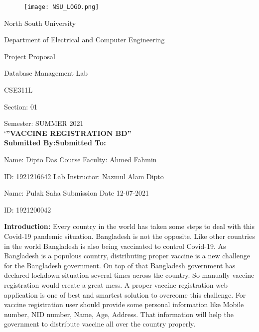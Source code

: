 \documentclass[
]{article}
\author{}
\date{}
\begin{document}
\begin{figure}
\quad \quad \quad \quad \quad \quad \quad \quad  \texttt{[image: NSU\_LOGO.png]}
\end{figure}
\quad \quad \quad \quad \quad \quad \quad \quad \quad \quad \quad North South University

\quad \quad \quad \quad \quad \quad \quad Department of Electrical and Computer Engineering

\quad \quad \quad \quad \quad\quad \quad \quad \quad \quad \quad  Project Proposal

\quad \quad \quad \quad \quad\quad \quad \quad \quad \quad Database Management Lab

\quad \quad \quad \quad \quad\quad \quad \quad \quad \quad \quad \quad \quad  CSE311L

\quad \quad \quad  \quad \quad\quad \quad \quad \quad \quad \quad \quad \quad Section: 01

\quad \quad \quad \quad \quad\quad \quad \quad \quad \quad \quad Semester: SUMMER 2021 \\[5mm]

\quad \quad \quad\quad  \quad \quad \quad`\textbf{''VACCINE REGISTRATION BD''} \\[5mm]

\quad \quad \quad \textbf{Submitted By:}\quad \quad \quad \quad \quad \quad \quad  \textbf{Submitted To:}

\quad \quad \quad Name: Dipto Das \quad \quad \quad \quad \quad \quad Course Faculty: Ahmed Fahmin

\quad \quad \quad ID: 1921216642 \quad \quad \quad \quad \quad\quad \quad  Lab Instructor: Nazmul Alam Dipto

\quad \quad \quad Name: Pulak Saha \quad \quad \quad \quad \quad \quad Submission Date 12-07-2021

\quad \quad \quad ID: 1921200042









\textbf{Introduction:} Every country in the world has taken some steps
to deal with this Covid-19 pandemic situation. Bangladesh is not the
opposite. Like other countries in the world Bangladesh is also being
vaccinated to control Covid-19. As Bangladesh is a populous country,
distributing proper vaccine is a new challenge for the Bangladesh
government. On top of that Bangladesh government has declared lockdown
situation several times across the country. So manually vaccine
registration would create a great mess. A proper vaccine registration
web application is one of best and smartest solution to overcome this
challenge. For vaccine registration user should provide some personal
information like Mobile number, NID number, Name, Age, Address. That
information will help the government to distribute vaccine all over the
country properly.\\[2mm]
\end{document}

